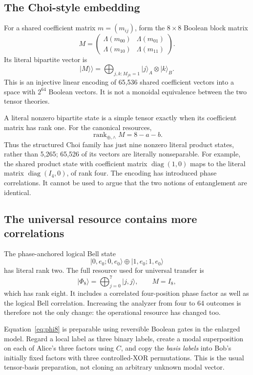 \documentclass[11pt,a4paper]{article}
\theoremstyle{definition}\newtheorem{definition}[theorem]{Definition}
\newcommand{\rk}{\operatorname{rank}_{\oplus,\wedge}}
\newcommand{\ket}[1]{\lvert #1\rangle}
\begin{document}
\subsection{The Choi-style embedding}
For a shared coefficient matrix $m=(m_{ij})$, form the $8\times8$ Boolean block matrix
\[
 M=\begin{pmatrix}\Lambda(m_{00})&\Lambda(m_{01})\\
 \Lambda(m_{10})&\Lambda(m_{11})\end{pmatrix}.
\]
Its literal bipartite vector is
\begin{equation}
 \ket{M}\!\rangle=\bigoplus_{j,k:M_{jk}=1}\ket{j}_A\otimes\ket{k}_B.
 \label{eq:choi}
\end{equation}
This is an injective linear encoding of 65,536 shared coefficient vectors into a space with $2^{64}$ Boolean vectors. It is not a monoidal equivalence between the two tensor theories.

A literal nonzero bipartite state is a simple tensor exactly when its coefficient matrix has rank one. For the canonical resources,
\[
 \rk M=8-a-b.
\]
Thus the structured Choi family has just nine nonzero literal product states, rather than 5,265; 65,526 of its vectors are literally nonseparable. For example, the shared product state with coefficient matrix $\operatorname{diag}(1,0)$ maps to the literal matrix $\operatorname{diag}(I_4,0)$, of rank four. The encoding has introduced phase correlations. It cannot be used to argue that the two notions of entanglement are identical.

\subsection{The universal resource contains more correlations}
The phase-anchored logical Bell state
\[
 \ket{0,e_0;0,e_0}\oplus\ket{1,e_0;1,e_0}
\]
has literal rank two. The full resource used for universal transfer is
\begin{equation}
 \ket{\Phi_8}=\bigoplus_{j=0}^{7}\ket{j,j},\qquad M=I_8,
 \label{eq:phi8}
\end{equation}
which has rank eight. It includes a correlated four-position phase factor as well as the logical Bell correlation. Increasing the analyzer from four to 64 outcomes is therefore not the only change: the operational resource has changed too.

Equation~\eqref{eq:phi8} is preparable using reversible Boolean gates in the enlarged model. Regard a local label as three binary labels, create a modal superposition on each of Alice's three factors using $C$, and copy the \emph{basis labels} into Bob's initially fixed factors with three controlled-XOR permutations. This is the usual tensor-basis preparation, not cloning an arbitrary unknown modal vector.
\end{document}
